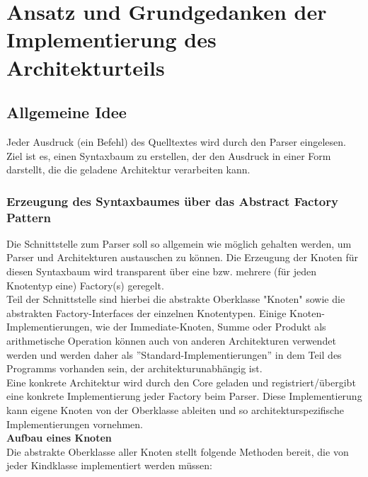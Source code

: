 
\section{Ansatz und Grundgedanken der Implementierung des Architekturteils}
\subsection{Allgemeine Idee}
Jeder Ausdruck (ein Befehl) des Quelltextes wird durch den Parser eingelesen. Ziel ist es, einen Syntaxbaum zu erstellen, der den Ausdruck in einer Form darstellt, die die geladene Architektur verarbeiten kann.

\subsubsection{Erzeugung des Syntaxbaumes über das Abstract Factory Pattern}
Die Schnittstelle zum Parser soll so allgemein wie möglich gehalten werden, um Parser und Architekturen austauschen zu können. Die Erzeugung der Knoten für diesen Syntaxbaum wird transparent über eine bzw. mehrere (für jeden Knotentyp eine) Factory(s) geregelt.\\
Teil der Schnittstelle sind hierbei die abstrakte Oberklasse "Knoten" sowie die abstrakten Factory-Interfaces der einzelnen Knotentypen. Einige Knoten-Implementierungen, wie der Immediate-Knoten, Summe oder Produkt als arithmetische Operation können auch von anderen Architekturen verwendet werden und werden daher als ''Standard-Implementierungen'' in dem Teil des Programms vorhanden sein, der architekturunabhängig ist.\\
Eine konkrete Architektur wird durch den Core geladen und registriert/übergibt eine konkrete Implementierung jeder Factory beim Parser. Diese Implementierung kann eigene Knoten von der Oberklasse ableiten und so architekturspezifische Implementierungen vornehmen.\\
\textbf{Aufbau eines Knoten}\\
Die abstrakte Oberklasse aller Knoten stellt folgende Methoden bereit, die von jeder Kindklasse implementiert werden müssen:
